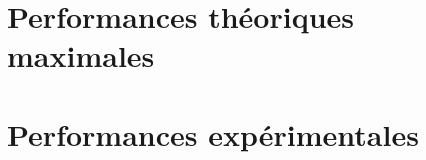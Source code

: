 \documentclass[a4paper]{article}
\begin{document}

\section{Performances théoriques maximales}







\section{Performances expérimentales}




\end{document}

